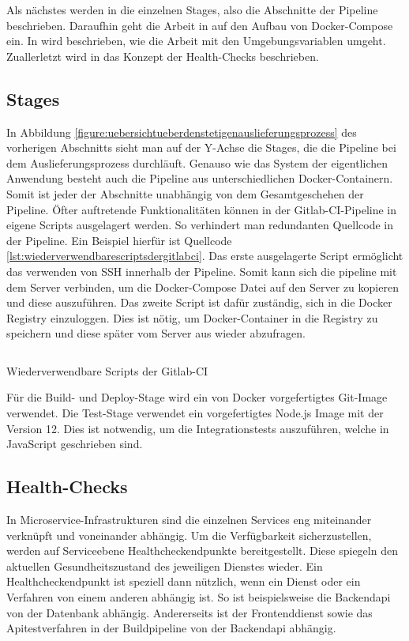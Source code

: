 Als nächstes werden in  die einzelnen Stages, also die Abschnitte der Pipeline
beschrieben. Daraufhin geht die Arbeit in  auf den Aufbau von Docker-Compose ein.
In  wird beschrieben, wie die Arbeit mit den Umgebungsvariablen umgeht.
Zuallerletzt wird in  das Konzept der Health-Checks beschrieben.

\subsection{Stages}
\label{subsec:stages}
In Abbildung \ref{figure:uebersichtueberdenstetigenauslieferungsprozess} des vorherigen Abschnitts
sieht man auf der Y-Achse die Stages, die die Pipeline bei dem Auslieferungsprozess durchläuft.
Genauso wie das System der eigentlichen Anwendung besteht auch die Pipeline aus unterschiedlichen
Docker-Containern. Somit ist jeder der Abschnitte unabhängig von dem Gesamtgeschehen der Pipeline.
Öfter auftretende Funktionalitäten können in der Gitlab-CI-Pipeline in eigene Scripts ausgelagert
werden. So verhindert man redundanten Quellcode in der Pipeline. Ein Beispiel hierfür
ist Quellcode \ref{lst:wiederverwendbarescriptsdergitlabci}. Das erste ausgelagerte
Script ermöglicht das verwenden von SSH innerhalb der Pipeline. Somit kann sich
die pipeline mit dem Server verbinden, um die Docker-Compose Datei auf den Server
zu kopieren und diese auszuführen. Das zweite Script ist dafür zuständig,
sich in die Docker Registry einzuloggen. Dies ist nötig, um Docker-Container
in die Registry zu speichern und diese später vom Server aus wieder abzufragen.

\begin{listing}
    \inputminted{yaml}{snippets/yml/reusable_scripts.yml}
    \caption{Wiederverwendbare Scripts der Gitlab-CI}
    \label{lst:wiederverwendbarescriptsdergitlabci}
\end{listing}

Für die Build- und Deploy-Stage wird ein von Docker vorgefertigtes Git-Image verwendet.
Die Test-Stage verwendet ein vorgefertigtes Node.js Image mit der Version 12. Dies ist notwendig,
um die Integrationstests auszuführen, welche in JavaScript geschrieben sind.

\subsection{Health-Checks}
\label{subsec:healthcheck}
In Microservice-Infrastrukturen sind die einzelnen Services eng miteinander verknüpft
und voneinander abhängig. Um die Verfügbarkeit sicherzustellen, werden auf
Serviceebene Healthcheckendpunkte bereitgestellt. Diese spiegeln den aktuellen
Gesundheitszustand des jeweiligen Dienstes wieder. Ein Healthcheckendpunkt
ist speziell dann nützlich, wenn ein Dienst oder ein Verfahren von einem anderen
abhängig ist. So ist beispielsweise die Backendapi von der Datenbank
abhängig. Andererseits ist der Frontenddienst sowie das Apitestverfahren
in der Buildpipeline von der Backendapi abhängig. 

